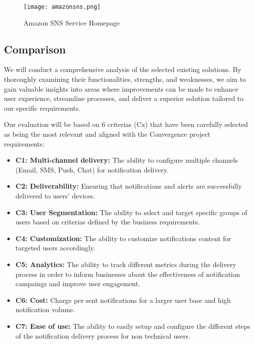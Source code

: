 \begin{figure}[hbt!]
    \centering
    \texttt{[image: amazonsns.png]}
    \caption{Amazon SNS Service Homepage}
\end{figure}

\subsection{Comparison}
We will conduct a comprehensive analysis of the selected existing solutions.
By thoroughly examining their functionalities, strengths, and weaknesses, we aim to gain valuable insights 
into areas where improvements can be made to enhance user experience, streamline processes, and deliver 
a superior solution tailored to our specific requirements.

Our evaluation will be based on 6 criterias (Cx) that have been carefully selected as being the most 
relevant and aligned with the Convergence project requirements:

\begin{itemize}
    \item \textbf{C1: Multi-channel delivery:} The ability to configure multiple channels (Email, SMS, 
    Push, Chat) for notification delivery.
    \item \textbf{C2: Deliverability:} Ensuring that notifications and alerts are successfully delivered 
    to users' devices.
    \item \textbf{C3: User Segmentation:} The ability to select and target specific groups of users based on 
    criterias defined by the business requirements.
    \item \textbf{C4: Customization:}  The ability to customize notifications content for targeted users accordingly.
    \item \textbf{C5: Analytics:} The ability to track different metrics during the delivery process 
    in order to inform businesses about the effectiveness of notification campaings and improve user engagement.
    \item \textbf{C6: Cost:} Charge per sent notifications for a larger user base and high notification volume.
    \item \textbf{C7: Ease of use:} The ability to easily setup and configure the different steps of the notification
    delivery process for non technical users.
\end{itemize} 

